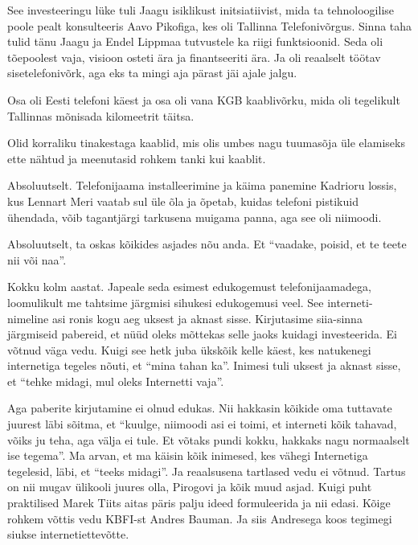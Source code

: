 
See investeeringu lüke tuli Jaagu isiklikust initsiatiivist, mida ta  tehnoloogilise poole pealt konsulteeris Aavo Pikofiga, kes oli Tallinna Telefonivõrgus. Sinna taha tulid tänu Jaagu ja Endel Lippmaa tutvustele ka riigi funktsioonid. Seda oli tõepoolest vaja, visioon osteti ära ja finantseeriti ära. Ja oli reaalselt töötav sisetelefonivõrk, aga eks ta mingi aja pärast jäi ajale jalgu.


Osa oli Eesti telefoni käest ja osa oli vana KGB kaablivõrku, mida oli tegelikult Tallinnas mõnisada kilomeetrit täitsa.


Olid korraliku tinakestaga kaablid, mis olis umbes nagu tuumasõja üle elamiseks ette nähtud ja meenutasid rohkem tanki kui kaablit.


Absoluutselt. Telefonijaama installeerimine ja käima panemine Kadrioru lossis, kus Lennart Meri vaatab sul üle õla ja õpetab, kuidas telefoni pistikuid ühendada, võib tagantjärgi tarkusena muigama panna, aga see oli niimoodi. 


Absoluutselt, ta oskas kõikides asjades nõu anda. Et \enquote{vaadake, poisid, et te teete nii või naa}.


Kokku kolm aastat. Japeale seda esimest edukogemust telefonijaamadega, loomulikult me tahtsime järgmisi sihukesi edukogemusi veel. See interneti-nimeline asi ronis kogu aeg uksest ja aknast sisse. Kirjutasime siia-sinna järgmiseid pabereid, et nüüd oleks mõttekas selle jaoks kuidagi investeerida. Ei võtnud väga vedu. Kuigi see hetk juba ükskõik kelle käest, kes natukenegi internetiga tegeles nõuti, et \enquote{mina tahan ka}. Inimesi tuli uksest ja aknast sisse, et \enquote{tehke midagi, mul oleks Internetti vaja}. 

Aga paberite kirjutamine ei olnud edukas. Nii hakkasin kõikide oma tuttavate juurest läbi sõitma, et \enquote{kuulge, niimoodi asi ei toimi, et interneti kõik tahavad, võiks ju teha, aga välja ei tule. Et  võtaks pundi kokku, hakkaks nagu normaalselt ise tegema}. Ma arvan, et ma käisin kõik inimesed, kes vähegi Internetiga tegelesid, läbi, et \enquote{teeks midagi}. Ja reaalsusena tartlased vedu ei võtnud. Tartus on nii mugav ülikooli juures olla,  Pirogovi ja kõik muud asjad. Kuigi puht praktilised Marek Tiits aitas päris palju ideed formuleerida ja nii edasi. Kõige rohkem võttis vedu KBFI-st Andres Bauman. Ja siis Andresega koos tegimegi siukse internetiettevõtte. 

